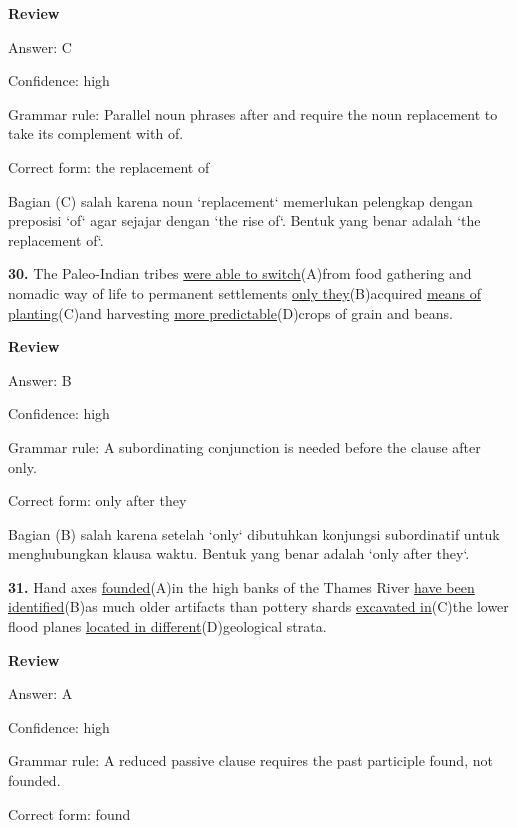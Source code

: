 \documentclass[12pt]{article}
\begin{document}
\par
\begingroup
\setlength{\parskip}{0pt}
\setlength{\parindent}{0pt}
\textbf{Review}\par
Answer: C\par
Confidence: high\par
Grammar rule: Parallel noun phrases after and require the noun replacement to take its complement with of.\par
Correct form: the replacement of\par
Bagian (C) salah karena noun `replacement` memerlukan pelengkap dengan preposisi `of` agar sejajar dengan `the rise of`. Bentuk yang benar adalah `the replacement of`.\par
\endgroup
\par
\vspace{\questionblockgap}
\noindent\textbf{30.} The Paleo-Indian tribes \uline{were able to switch}(A)from food gathering and nomadic way of life to permanent settlements \uline{only they}(B)acquired \uline{means of planting}(C)and harvesting \uline{more predictable}(D)crops of grain and beans.
\par
\begingroup
\setlength{\parskip}{0pt}
\setlength{\parindent}{0pt}
\textbf{Review}\par
Answer: B\par
Confidence: high\par
Grammar rule: A subordinating conjunction is needed before the clause after only.\par
Correct form: only after they\par
Bagian (B) salah karena setelah `only` dibutuhkan konjungsi subordinatif untuk menghubungkan klausa waktu. Bentuk yang benar adalah `only after they`.\par
\endgroup
\par
\vspace{\questionblockgap}
\noindent\textbf{31.} Hand axes \uline{founded}(A)in the high banks of the Thames River \uline{have been identified}(B)as much older artifacts than pottery shards \uline{excavated in}(C)the lower flood planes \uline{located in different}(D)geological strata.
\par
\begingroup
\setlength{\parskip}{0pt}
\setlength{\parindent}{0pt}
\textbf{Review}\par
Answer: A\par
Confidence: high\par
Grammar rule: A reduced passive clause requires the past participle found, not founded.\par
Correct form: found\par
\end{document}
